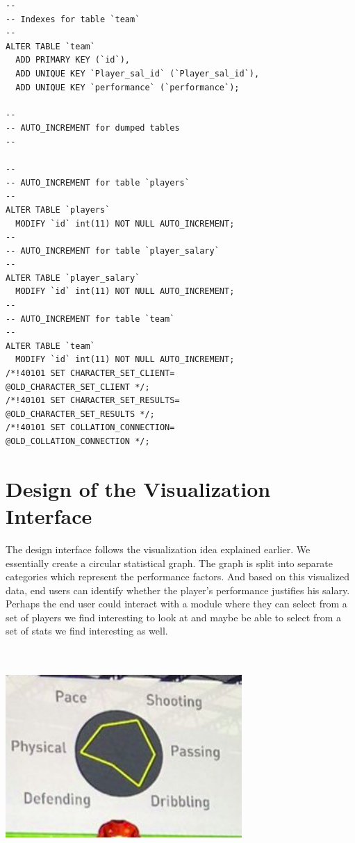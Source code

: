 \documentclass[journal]{vgtc}                %
\begin{document}
\begin{lstlisting}
--
-- Indexes for table `team`
--
ALTER TABLE `team`
  ADD PRIMARY KEY (`id`),
  ADD UNIQUE KEY `Player_sal_id` (`Player_sal_id`),
  ADD UNIQUE KEY `performance` (`performance`);

--
-- AUTO_INCREMENT for dumped tables
--

--
-- AUTO_INCREMENT for table `players`
--
ALTER TABLE `players`
  MODIFY `id` int(11) NOT NULL AUTO_INCREMENT;
--
-- AUTO_INCREMENT for table `player_salary`
--
ALTER TABLE `player_salary`
  MODIFY `id` int(11) NOT NULL AUTO_INCREMENT;
--
-- AUTO_INCREMENT for table `team`
--
ALTER TABLE `team`
  MODIFY `id` int(11) NOT NULL AUTO_INCREMENT;
/*!40101 SET CHARACTER_SET_CLIENT=
@OLD_CHARACTER_SET_CLIENT */;
/*!40101 SET CHARACTER_SET_RESULTS=
@OLD_CHARACTER_SET_RESULTS */;
/*!40101 SET COLLATION_CONNECTION=
@OLD_COLLATION_CONNECTION */;

\end{lstlisting}

\section{Design of the Visualization Interface}
The design interface follows the visualization idea explained earlier. We essentially create a circular statistical graph. The graph is split into separate categories which represent the performance factors. And based on this visualized data, end users can identify whether the player’s performance justifies his salary. Perhaps the end user could interact with a module where they can select from a set of players we find interesting to look at and maybe be able to select from a set of stats we find interesting as well.
\includegraphics[width=9cm, height=9cm]{stats}



\end{document}
